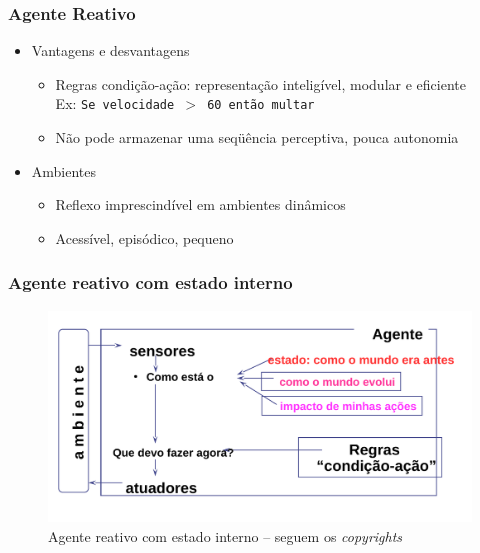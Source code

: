 
\begin{frame} %

    \frametitle{Agente Reativo}

\begin{itemize}
  \item Vantagens e desvantagens
  \begin{itemize}
    \item Regras condição-ação: representação inteligível, modular e eficiente\\ 
Ex: \texttt{Se velocidade $>$ 60 então multar}
   \item Não pode armazenar uma seqüência perceptiva, pouca autonomia
  \end{itemize}
  
  \item Ambientes
\begin{itemize}
  \item Reflexo imprescindível em ambientes dinâmicos 
  \item Acessível, episódico, pequeno 
\end{itemize}
  
\end{itemize}
\end{frame}


\begin{frame} %

 \frametitle{Agente reativo com estado interno}

\begin{figure}[!ht]
  \centering
  \includegraphics[height =.6\textheight,width=.7\textwidth]
  {figuras/agente_reativo_com_estado_interno.pdf}
  \caption{Agente reativo com estado interno -- seguem os \textit{copyrights}}
\end{figure}

\end{frame}



